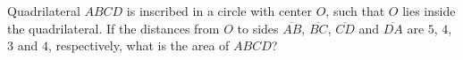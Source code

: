 Quadrilateral $ABCD$ is inscribed in a circle with center $O$, such that $O$ lies inside the quadrilateral. If the distances from $O$ to sides $\overline{AB}$, $\overline{BC}$, $\overline{CD}$ and $\overline{DA}$ are $5$, $4$, $3$ and $4$, respectively, what is the area of $ABCD$?

